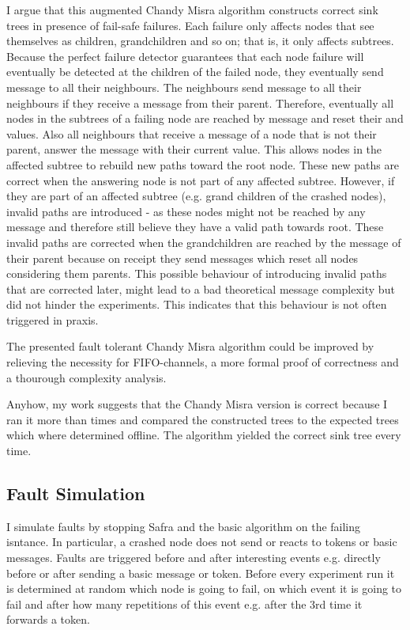   I argue that this augmented Chandy Misra algorithm constructs correct sink trees in presence of fail-safe failures. 
  Each failure only affects nodes that see themselves as children, grandchildren and so on; that is, it only affects subtrees.
  Because the perfect failure detector guarantees that each node failure will eventually be detected at the children of the failed node, they eventually send  message to all their neighbours.
  The neighbours send  message to all their neighbours if they receive a  message from their parent. 
  Therefore, eventually all nodes in the subtrees of a failing node are reached by  message and reset their  and  values.
  Also all neighbours that receive a  message of a node that is not their parent, answer the  message with their current  value.
  This allows nodes in the affected subtree to rebuild new paths toward the root node.
  These new paths are correct when the answering node is not part of any affected subtree.
  However, if they are part of an affected subtree (e.g. grand children of the crashed nodes), invalid paths are introduced - as these nodes might not be reached by any  message and therefore still believe they have a valid path towards root.
  These invalid paths are corrected when the grandchildren are reached by the  message of their parent because on receipt they send  messages which reset all nodes considering them
  parents. 
  This possible behaviour of introducing invalid paths that are corrected later, might lead to a bad theoretical message complexity but did not hinder the experiments.
  This indicates that this behaviour is not often triggered in praxis.
  
  The presented fault tolerant Chandy Misra algorithm could be improved by relieving the necessity for FIFO-channels, a more formal proof of correctness and a thourough complexity analysis.

  Anyhow, my work suggests that the Chandy Misra version is correct because I ran it more than %
  times and compared the constructed trees to the expected trees which where determined offline. The algorithm yielded the correct sink tree every time.
  
  
  
  
\subsection{Fault Simulation}
	I simulate faults by stopping Safra and the basic algorithm on the failing isntance.
	In particular, a crashed node does not send or reacts to tokens or basic messages.
	Faults are triggered before and after interesting events e.g. directly before or after sending a basic message or token. 
	Before every experiment run it is determined at random which node is going to fail, on which event it is going to fail and after how many repetitions of this event e.g. after the 3rd time it forwards a token.
	

